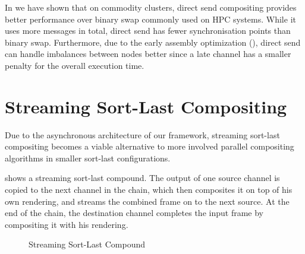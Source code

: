 In \cite{EP:07} we have shown that on commodity clusters, direct send
compositing provides better performance over binary swap commonly used on HPC
systems. While it uses more messages in total, direct send has fewer
synchronisation points than binary swap. Furthermore, due to the early assembly
optimization (), direct send can handle imbalances between
nodes better since a late channel has a smaller penalty for the overall
execution time.

\section{Streaming Sort-Last Compositing}

Due to the asynchronous architecture of our framework, streaming sort-last
compositing becomes a viable alternative to more involved parallel compositing
algorithms in smaller sort-last configurations.

 shows a streaming sort-last compound. The output of one source
channel is copied to the next channel in the chain, which then composites it on
top of his own rendering, and streams the combined frame on to the next source.
At the end of the chain, the destination channel completes the input frame by
compositing it with his rendering.

\begin{figure}[h!t]\center
  \hfil{}
  {\caption{Streaming Sort-Last Compound}}
\end{figure}

